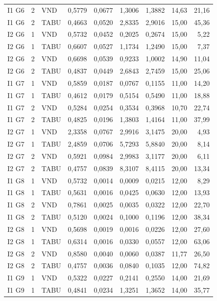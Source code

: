 \begin{longtable}{lrlrrrrrr}
I1 G6 & 2 & VND & 0,5779 & 0,0677 & 1,3006 & 1,3882 & 14,63 & 21,16 \\
I1 G6 & 2 & TABU & 0,4663 & 0,0520 & 2,8335 & 2,9016 & 15,00 & 45,36 \\
I2 G6 & 1 & VND & 0,5732 & 0,0452 & 0,2025 & 0,2674 & 15,00 & 5,22 \\
I2 G6 & 1 & TABU & 0,6607 & 0,0527 & 1,1734 & 1,2490 & 15,00 & 7,37 \\
I2 G6 & 2 & VND & 0,6698 & 0,0539 & 0,9233 & 1,0002 & 14,90 & 11,04 \\
I2 G6 & 2 & TABU & 0,4837 & 0,0449 & 2,6843 & 2,7459 & 15,00 & 25,06 \\
I1 G7 & 1 & VND & 0,5859 & 0,0187 & 0,0767 & 0,1155 & 11,00 & 14,20 \\
I1 G7 & 1 & TABU & 0,4612 & 0,0179 & 0,5154 & 0,5490 & 11,00 & 18,88 \\
I1 G7 & 2 & VND & 0,5284 & 0,0254 & 0,3534 & 0,3968 & 10,70 & 22,74 \\
I1 G7 & 2 & TABU & 0,4825 & 0,0196 & 1,3803 & 1,4164 & 11,00 & 37,99 \\
I2 G7 & 1 & VND & 2,3358 & 0,0767 & 2,9916 & 3,1475 & 20,00 & 4,93 \\
I2 G7 & 1 & TABU & 2,4859 & 0,0706 & 5,7293 & 5,8840 & 20,00 & 8,14 \\
I2 G7 & 2 & VND & 0,5921 & 0,0984 & 2,9983 & 3,1177 & 20,00 & 6,11 \\
I2 G7 & 2 & TABU & 0,4757 & 0,0839 & 8,3107 & 8,4115 & 20,00 & 13,34 \\
I1 G8 & 1 & VND & 0,5732 & 0,0014 & 0,0009 & 0,0215 & 12,00 & 8,29 \\
I1 G8 & 1 & TABU & 0,5631 & 0,0016 & 0,0425 & 0,0630 & 12,00 & 13,93 \\
I1 G8 & 2 & VND & 0,7861 & 0,0025 & 0,0035 & 0,0322 & 12,00 & 22,70 \\
I1 G8 & 2 & TABU & 0,5120 & 0,0024 & 0,1000 & 0,1196 & 12,00 & 38,34 \\
I2 G8 & 1 & VND & 0,5698 & 0,0019 & 0,0016 & 0,0226 & 12,00 & 27,60 \\
I2 G8 & 1 & TABU & 0,6314 & 0,0016 & 0,0330 & 0,0557 & 12,00 & 63,06 \\
I2 G8 & 2 & VND & 0,8580 & 0,0040 & 0,0060 & 0,0387 & 11,77 & 26,50 \\
I2 G8 & 2 & TABU & 0,4757 & 0,0036 & 0,0840 & 0,1035 & 12,00 & 74,82 \\
I1 G9 & 1 & VND & 0,5322 & 0,0227 & 0,2141 & 0,2550 & 14,00 & 21,69 \\
I1 G9 & 1 & TABU & 0,4841 & 0,0234 & 1,3251 & 1,3652 & 14,00 & 35,77 \\

\end{longtable}
